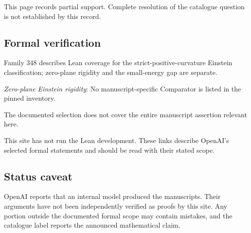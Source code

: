 \documentclass[11pt]{article}
\begin{document}
This page records partial support. Complete resolution of the catalogue question is not established by this record.

\subsection{Formal verification}
Family 348 describes Lean coverage for the strict-positive-curvature Einstein classification; zero-plane rigidity and the small-energy gap are separate.

\textit{Zero-plane Einstein rigidity}: No manuscript-specific Comparator is listed in the pinned inventory.

The documented selection does not cover the entire manuscript assertion relevant here.

This site has not run the Lean development. These links describe OpenAI’s selected formal statements and should be read with their stated scope.

\subsection{Status caveat}
OpenAI reports that an internal model produced the manuscripts. Their arguments have not been independently verified as proofs by this site. Any portion outside the documented formal scope may contain mistakes, and the catalogue label reports the announced mathematical claim.
\end{document}
